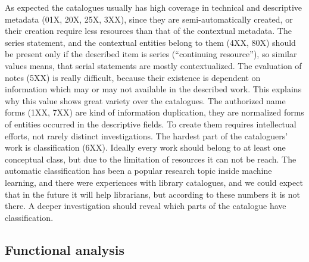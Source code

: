 As expected the catalogues usually has high coverage in technical and descriptive metadata (01X, 20X, 25X, 3XX), since they are semi-automatically created, or their creation require less resources than that of the contextual metadata. The series statement, and the contextual entities belong to them (4XX, 80X) should be present only if the described item is series (``continuing resource''), so similar values means, that serial statements are mostly contextualized. The evaluation of notes (5XX) is really difficult, because their existence is dependent on information which may or may not available in the described work. This explains why this value shows great variety over the catalogues. The authorized name forms (1XX, 7XX) are kind of information duplication, they are normalized forms of entities occurred in the descriptive fields. To create them requires intellectual efforts, not rarely distinct investigations. The hardest part of the cataloguers' work is classification (6XX). Ideally every work should belong to at least one conceptual class, but due to the limitation of resources it can not be reach. The automatic classification has been a popular research topic inside machine learning, and there were experiences with library catalogues, and we could expect that in the future it will help librarians, but according to these numbers it is not there. A deeper investigation should reveal which parts of the catalogue have classification.

\subsection{Functional analysis}

